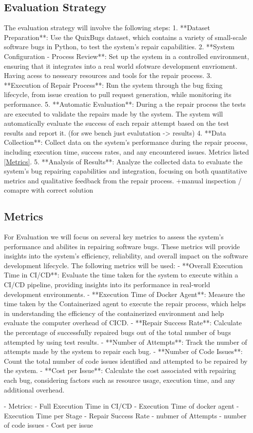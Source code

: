 \subsection{Evaluation Strategy}
The evaluation strategy will involve the following steps:
1. **Dataset Preparation**: Use the QuixBugs dataset, which contains a variety of small-scale software bugs in Python, to test the system's repair capabilities.
2. **System Configuration - Process Review**: Set up the system in a controlled environment, ensuring that it integrates into a real world sfotware development envrioment. Having acess to nesseary resources and tools for the repair process.
3. **Execution of Repair Process**: Run the system through the bug fixing lifecycle, from issue creation to pull request generation, while monitoring its performance.
5. **Automatic Evaluation**: During a the repair process the tests are executed to validate the repairs made by the system. The system will automatically evaluate the success of each repair attempt based on the test results and report it. (for swe bench just evalutation -> results)
4. **Data Collection**: Collect data on the system's performance during the repair process, including execution time, success rates, and any encountered issues. Metrics listed \ref{Metrics}.
5. **Analysis of Results**: Analyze the collected data to evaluate the system's bug repairing capabilities and integration, focusing on both quantitative metrics and qualitative feedback from the repair process. +manual inspection / comapre with correct solution
\subsection{Metrics}
For Evaluation we will focus on several key metrics to assess the system's performance and abilites in repairing software bugs. These metrics will provide insights into the system's efficiency, reliability, and overall impact on the software development lifecycle. The following metrics will be used:
- **Overall Execution Time in CI/CD**: Evaluate the time taken for the system to execute within a CI/CD pipeline, providing insights into its performance in real-world development environments.
- **Execution Time of Docker Agent**: Measure the time taken by the Containerized agent to execute the repair process, which helps in understanding the efficiency of the containerized environment and help evaluate the computer overhead of CICD.
- **Repair Success Rate**: Calculate the percentage of successfully repaired bugs out of the total number of bugs attempted by using test results.
- **Number of Attempts**: Track the number of attempts made by the system to repair each bug.
- **Number of Code Issues**: Count the total number of code issues identified and attempted to be repaired by the system.
- **Cost per Issue**: Calculate the cost associated with repairing each bug, considering factors such as resource usage, execution time, and any additional overhead.



- Metrics:
- Full Execution Time in CI/CD
- Execution Time of docker agent
- Execution Time per Stage
- Repair Success Rate
- nubmer of Attempts
- number of code issues
- Cost per issue

